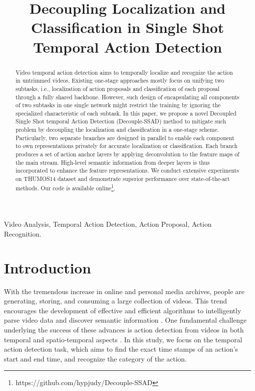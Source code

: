 \documentclass{article}
\title{Decoupling Localization and Classification in Single Shot Temporal Action Detection}
\begin{document}
\sloppy
\maketitle
\begin{abstract}
Video temporal action detection aims to temporally localize and recognize the action in untrimmed videos. 
Existing one-stage approaches mostly focus on unifying two subtasks, i.e., localization of action proposals and classification of each proposal through a fully shared backbone. However, such design of encapsulating all components of two subtasks in one single network might restrict the training by ignoring the specialized characteristic of each subtask.
In this paper, we propose a novel Decoupled Single Shot temporal Action Detection (Decouple-SSAD) method to mitigate such problem by decoupling the localization and classification in a one-stage scheme.
Particularly, two separate branches are designed in parallel to enable each component to own representations privately for accurate localization or classification.
Each branch produces a set of action anchor layers by applying deconvolution to the feature maps of the main stream.
High-level semantic information from deeper layers is thus incorporated to enhance the feature representations.
We conduct extensive experiments on THUMOS14 dataset and demonstrate superior performance over state-of-the-art methods.
Our code is available online\footnote{https://github.com/hypjudy/Decouple-SSAD}.
\end{abstract}
\begin{keywords}
Video Analysis, Temporal Action Detection, Action Proposal, Action Recognition.
\end{keywords}
\section{Introduction}
\label{sec:intro}
With the tremendous increase in online and personal media archives, people are generating, storing, and consuming a large collection of videos.
This trend encourages the development of effective and efficient algorithms to intelligently
parse video data \cite{simonyan2014two,qiu2017deep,li2016action,qiu2017learning,li2018unified,qiu2019learning} and discover semantic information \cite{li2018jointly,qiu2018learning}.
One fundamental challenge underlying the success of these advances is action detection from videos in both temporal \cite{shou2016temporal,long2019gaussian} and spatio-temporal aspects \cite{li2018recurrent}.
In this study, we focus on the temporal action detection task, which aims to find the exact time stamps of an action's start and end time, and recognize the category of the action.
\end{document}
